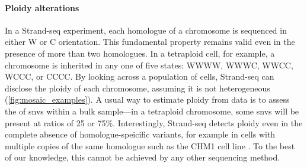 

\paragraph{Ploidy alterations}
In a Strand-seq experiment, each homologue of a chromosome is sequenced in
either W or C orientation. This fundamental property remains valid even in the
presence of more than two homologues. In a tetraploid cell, for example, a
chromosome is inherited in any one of five states: WWWW, WWWC, WWCC, WCCC, or
CCCC. By looking across a population of cells, Strand-seq can disclose the
ploidy of each chromosome, assuming it is not heterogeneous
(\cref{fig:mosaic_examples}). A
usual way to estimate ploidy from \mps data is to assess the \baf of \acp{snv} within a bulk
sample---in a tetraploid chromosome, some \acp{snv} will be present at ratios of
25 or 75\%. Interestingly, Strand-seq detects ploidy even in the complete
absence of homologue-speicific variants, for example in cells with multiple
copies of the same homologue such as the CHM1 cell line \citep{Steinberg2014}.
To the best of our knowledge, this cannot be achieved by any other sequencing method.

